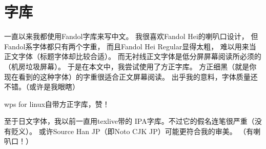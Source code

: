 \documentclass[a5paper, 10pt]{article}
\begin{document}
    \section{字库}{
        一直以来我都使用Fandol字库来写中文。
        我很喜欢Fandol Hei的喇叭口设计，
        但Fandol系字体都只有两个字重，
        而且Fandol Hei Regular显得太粗，
        难以用来当正文字体（标题字体却比较合适）。
        而无衬线正文字体是低分屏屏幕阅读所必须的（机房垃圾屏幕）。
        于是在本文中，我尝试使用了方正字库。
        方正细黑（就是你现在看到的这种字体）的字重很适合正文屏幕阅读。
        出乎我的意料，字体质量还不错。（或许是我眼瞎）

        wps for linux自带方正字库，赞！

        至于日文字体，我以前一直用texlive带的
        IPA字库。不过它的假名连笔很严重（没有贬义）。
        或许Source Han JP（即Noto CJK JP）可能更符合我的审美。
        （有喇叭口！）
    }
\end{document}

